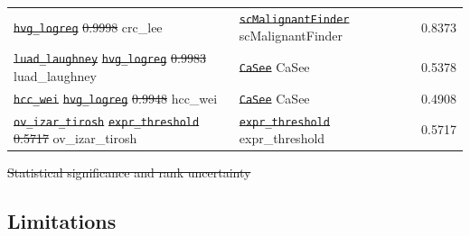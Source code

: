 \documentclass[10pt]{article}
\providecommand{\DIFaddtex}[1]{{\protect\color{trackgreen}#1}} %
\providecommand{\DIFdeltex}[1]{{\protect\color{red}\sout{#1}}}                      %
\providecommand{\DIFaddbegin}{} %
\providecommand{\DIFaddend}{} %
\providecommand{\DIFdelbegin}{} %
\providecommand{\DIFdelend}{} %
\providecommand{\DIFaddFL}[1]{\DIFadd{#1}} %
\providecommand{\DIFdelFL}[1]{\DIFdel{#1}} %
\providecommand{\DIFaddbeginFL}{} %
\providecommand{\DIFaddendFL}{} %
\providecommand{\DIFdelbeginFL}{} %
\providecommand{\DIFdelendFL}{} %
\providecommand{\DIFadd}[1]{\texorpdfstring{\DIFaddtex{#1}}{#1}} %
\providecommand{\DIFdel}[1]{\texorpdfstring{\DIFdeltex{#1}}{}} %
\newcommand{\DIFscaledelfig}{0.5}
\newlength{\DIFdelgraphicswidth} %
\newlength{\DIFdelgraphicsheight} %
\newcommand{\DIFaddincludegraphics}[2][]{{\color{trackgreen}\fbox{\DIFOincludegraphics[#1]{#2}}}} %
\newcommand{\DIFdelincludegraphics}[2][]{%
\sbox{\DIFdelgraphicsbox}{\DIFOincludegraphics[#1]{#2}}%
\settoboxwidth{\DIFdelgraphicswidth}{\DIFdelgraphicsbox} %
\settoboxtotalheight{\DIFdelgraphicsheight}{\DIFdelgraphicsbox} %
\scalebox{\DIFscaledelfig}{%
\parbox[b]{\DIFdelgraphicswidth}{\usebox{\DIFdelgraphicsbox}\\[-\baselineskip] \rule{\DIFdelgraphicswidth}{0em}}\llap{\resizebox{\DIFdelgraphicswidth}{\DIFdelgraphicsheight}{%
\setlength{\unitlength}{\DIFdelgraphicswidth}%
\begin{picture}(1,1)%
\thicklines\linethickness{2pt} %
{\color[rgb]{1,0,0}\put(0,0){\framebox(1,1){}}}%
{\color[rgb]{1,0,0}\put(0,0){\line( 1,1){1}}}%
{\color[rgb]{1,0,0}\put(0,1){\line(1,-1){1}}}%
\end{picture}%
}\hspace*{3pt}}} %
} %
\DeclareRobustCommand{\DIFaddbegin}{\DIFOaddbegin \let\includegraphics\DIFaddincludegraphics} %
\DeclareRobustCommand{\DIFaddend}{\DIFOaddend \let\includegraphics\DIFOincludegraphics} %
\DeclareRobustCommand{\DIFdelbegin}{\DIFOdelbegin \let\includegraphics\DIFdelincludegraphics} %
\DeclareRobustCommand{\DIFdelend}{\DIFOaddend \let\includegraphics\DIFOincludegraphics} %
\DeclareRobustCommand{\DIFaddbeginFL}{\DIFOaddbeginFL \let\includegraphics\DIFaddincludegraphics} %
\DeclareRobustCommand{\DIFaddendFL}{\DIFOaddendFL \let\includegraphics\DIFOincludegraphics} %
\DeclareRobustCommand{\DIFdelbeginFL}{\DIFOdelbeginFL \let\includegraphics\DIFdelincludegraphics} %
\DeclareRobustCommand{\DIFdelendFL}{\DIFOaddendFL \let\includegraphics\DIFOincludegraphics} %
\begin{document}
\begin{longtable}[]{@{}lll@{}}
\texttt{\DIFdelFL{hvg\_logreg}}     %
\DIFdelFL{0.9998 }\DIFdelendFL \DIFaddbeginFL \DIFaddFL{crc\_lee }\DIFaddendFL & \DIFdelbeginFL \texttt{\DIFdelFL{scMalignantFinder}} %
\DIFdelendFL \DIFaddbeginFL \DIFaddFL{scMalignantFinder }\DIFaddendFL & 0.8373 \\
\DIFdelbeginFL \texttt{\DIFdelFL{luad\_laughney}}   %
\texttt{\DIFdelFL{hvg\_logreg}}     %
\DIFdelFL{0.9983 }\DIFdelendFL \DIFaddbeginFL \DIFaddFL{luad\_laughney }\DIFaddendFL & \DIFdelbeginFL \texttt{\DIFdelFL{CaSee}}             %
\DIFdelendFL \DIFaddbeginFL \DIFaddFL{CaSee }\DIFaddendFL & 0.5378 \\
\DIFdelbeginFL \texttt{\DIFdelFL{hcc\_wei}}         %
\texttt{\DIFdelFL{hvg\_logreg}}     %
\DIFdelFL{0.9948 }\DIFdelendFL \DIFaddbeginFL \DIFaddFL{hcc\_wei }\DIFaddendFL & \DIFdelbeginFL \texttt{\DIFdelFL{CaSee}}             %
\DIFdelendFL \DIFaddbeginFL \DIFaddFL{CaSee }\DIFaddendFL & 0.4908 \\
\DIFdelbeginFL \texttt{\DIFdelFL{ov\_izar\_tirosh}} %
\texttt{\DIFdelFL{expr\_threshold}} %
\DIFdelFL{0.5717 }\DIFdelendFL \DIFaddbeginFL \DIFaddFL{ov\_izar\_tirosh }\DIFaddendFL & \DIFdelbeginFL \texttt{\DIFdelFL{expr\_threshold}}   %
\DIFdelendFL \DIFaddbeginFL \DIFaddFL{expr\_threshold }\DIFaddendFL & 0.5717 \\
\DIFdelbeginFL %
\DIFdelendFL \DIFaddbeginFL \end{longtable}
\DIFaddendFL 

\DIFdelbeginFL %
\DIFdelend \DIFaddbegin \begin{center}\DIFadd{\rule{0.5\linewidth}{0.5pt}}\end{center}
\DIFaddend 

\DIFdelbegin %
\DIFdel{Statistical significance and rank uncertainty}%
\DIFdelend \DIFaddbegin \subsection{\DIFadd{Limitations}}\label{limitations}
\DIFaddend 
\end{document}
